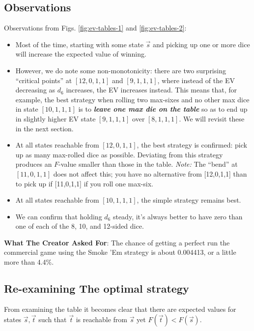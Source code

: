 \documentclass[11pt, oneside]{article} 	%
\begin{document}
\subsection{Observations}
Observations from Figs. \ref{fig:ev-tables-1} and \ref{fig:ev-tables-2}:
\begin{itemize}
\item Most of the time, starting with some state $\vec{s}$ and picking up one or more dice will increase the expected value of winning.
\item However, we do note some non-monotonicity: there are two surprising ``critical points'' at $[12,0,1,1]$ and $[9, 1, 1, 1]$, where instead of the EV decreasing as $d_6$ increases, the EV increases instead.  This means that, for example, the best strategy when rolling two max-sixes and no other max dice in state $[10, 1, 1, 1]$ is to \textit{\textbf{leave one max die on the table}} so as to end up in slightly higher EV state $[9,1,1,1]$ over $[8,1,1,1]$.  We will revisit these in the next section.
\item At all states reachable from $[12, 0, 1, 1]$, the best strategy is confirmed: pick up as many max-rolled dice as possible.  Deviating from this strategy produces an $F$-value smaller than those in the table. \textit{Note:} The ``bend'' at $[11,0,1,1]$ does not affect this; you have no alternative from [12,0,1,1] than to pick up if [11,0,1,1] if you roll one max-six.
\item At all states reachable from $[10,1,1,1]$, the simple strategy remains best.
\item We can confirm that holding $d_6$ steady, it's always better to have zero than one of each of the 8, 10, and 12-sided dice.
\end{itemize}

\begin{framed}
\textbf{What The Creator Asked For}: The chance of getting a perfect run the commercial game using the Smoke 'Em strategy is about 0.004413, or a little more than 4.4\%.
\end{framed}

\subsection{Re-examining The optimal strategy}

From examining the table it becomes clear that there are expected values for states $\vec{s}, \vec{t}$ such that $\vec{t}$ is reachable from $\vec{s}$ yet $F(\vec{t} ) < F(\vec{s})$.  
\end{document}

